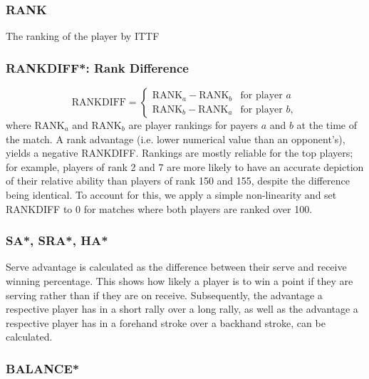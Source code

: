 \subsubsection*{RANK} \label{sec:rank}
The ranking of the player by ITTF 

\subsubsection*{RANKDIFF*: Rank Difference} \label{sec:rankdiff}
\begin{equation}
    \text{RANKDIFF} = \begin{cases}
\text{RANK}_a - \text{RANK}_b &\text{for player $a$} \\
\text{RANK}_b - \text{RANK}_a &\text{for player $b$},
\end{cases}
\end{equation}
where RANK$_a$ and RANK$_b$ are  player rankings for payers $a$ and $b$ at the time of the match. A rank advantage (i.e. lower numerical value than an opponent's), yields a negative RANKDIFF. Rankings are mostly reliable for the top players; for example, players of rank 2 and 7 are more likely to have an accurate depiction of their relative ability than players of rank 150 and 155, despite the difference being identical. To account for this, we apply a simple non-linearity and set RANKDIFF to $0$ for matches where both players are ranked over 100.%


\subsubsection*{SA*, SRA*, HA*} \label{sec:advantage}
Serve advantage is calculated as the difference between their serve and receive winning percentage. This shows how likely a player is to win a point if they are serving rather than if they are on receive. Subsequently, the advantage a respective player has in a short rally over a long rally, as well as the advantage a respective player has in a forehand stroke over a backhand stroke, can be calculated.

\subsubsection*{BALANCE*} \label{sec:balance}

